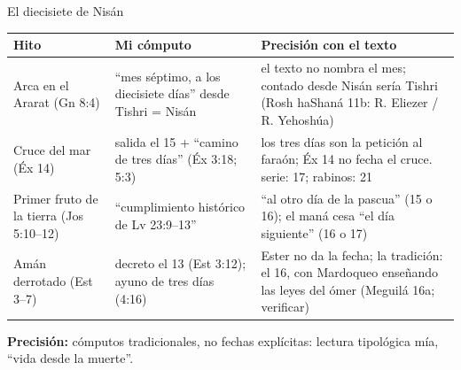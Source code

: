 \documentclass[hyperref={bookmarks=false},aspectratio=169]{beamer}
\newcommand{\precision}[1]{{\footnotesize\color{sepia}\textbf{Precisión:} #1}}
\begin{document}
\begin{frame}{El diecisiete de Nisán}
\scriptsize\renewcommand{\arraystretch}{1.1}
\begin{tabular}{@{}L{2.5cm}L{3.6cm}L{5.8cm}@{}}
\toprule
\textbf{Hito} & \textbf{Mi cómputo} & \textbf{Precisión con el texto} \\ \midrule
Arca en el Ararat (Gn 8:4) & ``mes séptimo, a los diecisiete días'' desde Tishri = Nisán & el texto no nombra el mes; contado desde Nisán sería Tishri (Rosh haShaná 11b: R. Eliezer / R. Yehoshúa) \\
Cruce del mar (Éx 14) & salida el 15 + ``camino de tres días'' (Éx 3:18; 5:3) & los tres días son la petición al faraón; Éx 14 no fecha el cruce. serie: 17; rabinos: 21 \\
Primer fruto de la tierra (Jos 5:10--12) & ``cumplimiento histórico de Lv 23:9--13'' & ``al otro día de la pascua'' (15 o 16); el maná cesa ``el día siguiente'' (16 o 17) \\
Amán derrotado (Est 3--7) & decreto el 13 (Est 3:12); ayuno de tres días (4:16) & Ester no da la fecha; la tradición: el 16, con Mardoqueo enseñando las leyes del ómer (Meguilá 16a; verificar) \\
\bottomrule
\end{tabular}\par\medskip
\precision{cómputos tradicionales, no fechas explícitas: lectura tipológica mía, ``vida desde la muerte''.}
\end{frame}
\end{document}
